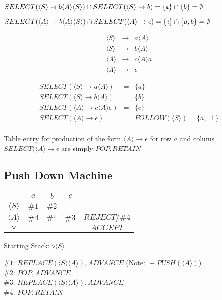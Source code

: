 \documentclass[a4paper,12pt]{article}
\newcommand{\nonterminal}[1]{\langle #1 \rangle}
\begin{document}
$SELECT(\nonterminal{S} \to b \nonterminal{A}\nonterminal{S}) \cap
SELECT(\nonterminal{S} \to b) \\ = \{a\} \cap \{b\} = \emptyset$

$SELECT(\nonterminal{A} \to b \nonterminal{A}\nonterminal{S}) \cap
SELECT(\nonterminal{A} \to \epsilon) \\ = \{c\} \cap \{a,b\} = \emptyset$


\begin{eqnarray*}
\nonterminal{S}	&	\to	&	a \nonterminal{A}				\\
\nonterminal{S}	&	\to	&	b \nonterminal{A}				\\
\nonterminal{A}	&	\to	&	c \nonterminal{A}	a			\\
\nonterminal{A}	&	\to	&	\epsilon							
\end{eqnarray*}

\begin{eqnarray*}
SELECT(\nonterminal{S}	\to	a \nonterminal{A}		) &	= 	&	\{a\}	\\
SELECT(\nonterminal{S}	\to	b \nonterminal{A}		) &	= 	&	\{b\}	\\
SELECT(\nonterminal{A}	\to	c \nonterminal{A}	a	) &	= 	&	\{c\}	\\
SELECT(\nonterminal{A}	\to	\epsilon					) &	= 	&
FOLLOW(\nonterminal{S}) = \{a,\dashv\}	\\
\end{eqnarray*}

Table entry for production of the form $\nonterminal{A} \to \epsilon$
for row $a$ and colums $SELECT(\nonterminal{A}	\to	\epsilon$ are
simply $POP,RETAIN$

\subsection*{Push Down Machine}

\begin{tabular}{|c|c|c|c|c|}
\hline
						&	$a$	&	$b$	&	$c$	&	$\dashv$	\\
\hline
$\nonterminal{S}$	&	$\#1$	&	$\#2$	&			&				\\
\hline
$\nonterminal{A}$	&	$\#4$	&	$\#4$	&	$\#3$	&	$REJECT/\#4$	\\
\hline
$\triangledown$	&			&			&			&	$ACCEPT$	\\
\hline
\end{tabular}

Starting Stack: $\triangledown \nonterminal{S}$

$\#1$: $REPLACE(\nonterminal{S}\nonterminal{A}),ADVANCE$ (Note: $\equiv PUSH(\nonterminal{A})$)\\
$\#2$: $POP,ADVANCE$ \\
$\#3$: $REPLACE(\nonterminal{S}\nonterminal{A}),ADVANCE$ \\
$\#4$: $POP,RETAIN$ \\
\end{document}
